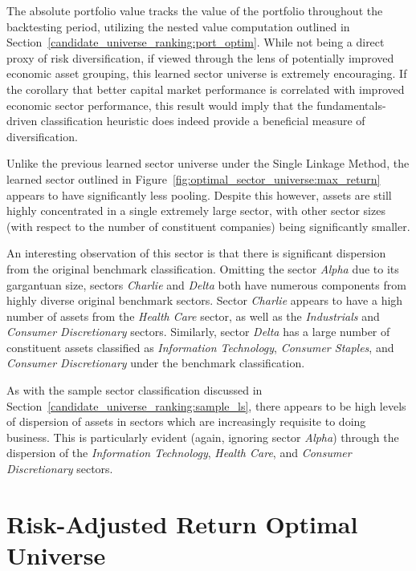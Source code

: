 \documentclass[../main.tex]{subfiles}
\begin{document}
The absolute portfolio value tracks the value of the portfolio throughout the backtesting period, utilizing the nested value computation outlined in Section~\ref{candidate_universe_ranking:port_optim}. While not being a direct proxy of risk diversification, if viewed through the lens of potentially improved economic asset grouping, this learned sector universe is extremely encouraging. If the corollary that better capital market performance is correlated with improved economic sector performance, this result would imply that the fundamentals-driven classification heuristic does indeed provide a beneficial measure of diversification.

Unlike the previous learned sector universe under the Single Linkage Method, the learned sector outlined in Figure~\ref{fig:optimal_sector_universe:max_return} appears to have significantly less pooling. Despite this however, assets are still highly concentrated in a single extremely large sector, with other sector sizes (with respect to the number of constituent companies) being significantly smaller.

An interesting observation of this sector is that there is significant dispersion from the original benchmark classification. Omitting the sector \textit{Alpha} due to its gargantuan size, sectors \textit{Charlie} and \textit{Delta} both have numerous components from highly diverse original benchmark sectors. Sector \textit{Charlie} appears to have a high number of assets from the \textit{Health Care} sector, as well as the \textit{Industrials} and \textit{Consumer Discretionary} sectors. Similarly, sector \textit{Delta} has a large number of constituent assets classified as \textit{Information Technology}, \textit{Consumer Staples}, and \textit{Consumer Discretionary} under the benchmark classification.

As with the sample sector classification discussed in Section~\ref{candidate_universe_ranking:sample_ls}, there appears to be high levels of dispersion of assets in sectors which are increasingly requisite to doing business. This is particularly evident (again, ignoring sector \textit{Alpha}) through the dispersion of the \textit{Information Technology}, \textit{Health Care}, and \textit{Consumer Discretionary} sectors.


\section{Risk-Adjusted Return Optimal Universe} \label{optimal_sector_universe:risk_adj_return_optimal}
\end{document}
